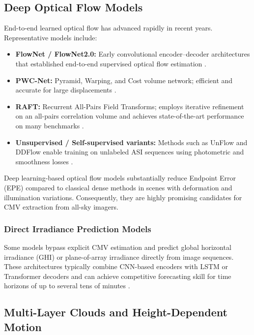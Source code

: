 \subsection*{Deep Optical Flow Models}
End-to-end learned optical flow has advanced rapidly in recent years. Representative models include:

\begin{itemize}
  \item \textbf{FlowNet / FlowNet2.0:} Early convolutional encoder--decoder architectures that established end-to-end supervised optical flow estimation \cite{dosovitskiy2015flownet,ilg2017flownet2}.
  \item \textbf{PWC-Net:} Pyramid, Warping, and Cost volume network; efficient and accurate for large displacements \cite{sun2018pwc}.
  \item \textbf{RAFT:} Recurrent All-Pairs Field Transforms; employs iterative refinement on an all-pairs correlation volume and achieves state-of-the-art performance on many benchmarks \cite{teed2020raft}.
  \item \textbf{Unsupervised / Self-supervised variants:} Methods such as UnFlow and DDFlow enable training on unlabeled ASI sequences using photometric and smoothness losses \cite{meister2018unflow,liu2019ddflow}.
\end{itemize}

Deep learning-based optical flow models substantially reduce Endpoint Error (EPE) compared to classical dense methods in scenes with deformation and illumination variations. Consequently, they are highly promising candidates for CMV extraction from all-sky imagers.

\subsubsection*{Direct Irradiance Prediction Models}
Some models bypass explicit CMV estimation and predict global horizontal irradiance (GHI) or plane-of-array irradiance directly from image sequences. These architectures typically combine CNN-based encoders with LSTM or Transformer decoders and can achieve competitive forecasting skill for time horizons of up to several tens of minutes \cite{qin2022cloudcast,nouri2021skycam}.

\subsection{Multi-Layer Clouds and Height-Dependent Motion}
\label{sec:multilayer}

